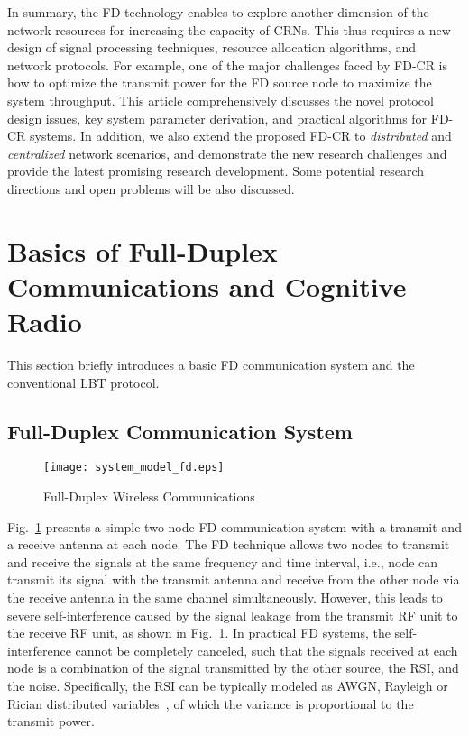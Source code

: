 \documentclass[onecolumn,12pt]{IEEEtran}
\begin{document}
In summary, the FD technology enables to explore another dimension of the network resources for increasing the capacity of CRNs. This thus requires a new design of signal processing techniques, resource allocation algorithms, and network protocols. For example, one of the major challenges faced by FD-CR is how to optimize the transmit power for the FD source node to maximize the system throughput. This article comprehensively discusses the novel protocol design issues, key system parameter derivation, and practical algorithms for FD-CR systems. In addition, we also extend the proposed FD-CR to {\em distributed} and { \em centralized} network scenarios, and demonstrate the new research challenges and provide the latest promising research development. Some potential research directions and open problems will be also discussed.


\section{Basics of Full-Duplex Communications and Cognitive Radio}

This section briefly introduces a basic FD communication system and the conventional LBT protocol.

\subsection{Full-Duplex Communication System}

\begin{figure}[ht]
\centering
\texttt{[image: system\_model\_fd.eps]}
\caption{Full-Duplex Wireless Communications} \label{fd}
\end{figure}

Fig.~\ref{fd} presents a simple two-node FD communication system with a transmit and a receive antenna at each node. The FD technique allows two nodes to transmit and receive the signals at the same frequency and time interval, i.e., node  can transmit its signal  with the transmit antenna and receive  from the other node via the receive antenna in the same channel simultaneously. However, this leads to severe self-interference caused by the signal leakage from the transmit RF unit to the receive RF unit, as shown in Fig.~\ref{fd}.
In practical FD systems, the self-interference cannot be completely canceled, such that the signals received at each node is a combination of the signal transmitted by the other source, the RSI, and the noise. Specifically, the RSI can be typically modeled as AWGN, Rayleigh or Rician distributed variables~\cite{Choi2010,zhou2014}, of which the variance is proportional to the transmit power.
\end{document}
